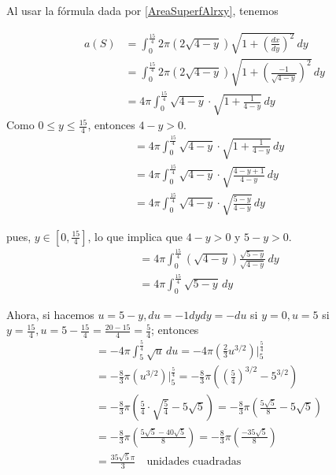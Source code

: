 
Al usar la fórmula dada por \eqref{AreaSuperfAlrxy}, tenemos

{\small
\begin{align*}
a(S) &= \int_{0}^{\frac{15}{4}} 2\pi \left( 2\sqrt{4 - y} \right) 
\sqrt{1 + \left( \frac{dx}{dy} \right)^2} \, dy \\
&= \int_{0}^{\frac{15}{4}} 2\pi \left( 2\sqrt{4 - y} \right) 
\sqrt{1 + \left( \frac{-1}{\sqrt{4 - y}} \right)^2} \, dy \\
&= 4\pi \int_{0}^{\frac{15}{4}} \sqrt{4 - y} \cdot 
\sqrt{1 + \frac{1}{4 - y}} \, dy
\end{align*}
}
Como $0\leq y\leq \frac{15}{4}$, entonces $4-y>0$.
{\small
\[
\begin{aligned}
&= 4\pi \int_{0}^{\frac{15}{4}} \sqrt{4 - y} \cdot \sqrt{1 + \frac{1}{4 - y}} \, dy \\
&= 4\pi \int_{0}^{\frac{15}{4}} \sqrt{4 - y} \cdot \sqrt{\frac{4 - y + 1}{4 - y}} \, dy \\
&= 4\pi \int_{0}^{\frac{15}{4}} \sqrt{4 - y} \cdot \sqrt{\frac{5 - y}{4 - y}} \, dy
\end{aligned}
\]
}

pues, $y\in \left[ 0,\frac{15}{4}\right] $, lo que implica que $4-y>0$ y $5-y>0$.
{\small
\begin{align*}
  &= 4\pi \int_{0}^{\frac{15}{4}} \left( \sqrt{4 - y} \right) \frac{\sqrt{5 - y}}{\sqrt{4 - y}} \, dy \\
  &= 4\pi \int_{0}^{\frac{15}{4}} \sqrt{5 - y} \, dy
\end{align*}
}

Ahora, si hacemos $u=5-y,  du=-1dy  dy=-du$ si $y=0,  u=5$  si $y=\frac{15}{4}, u=5-\frac{15}{4}=\frac{20-15} {4}=\frac{5}{4}$;  entonces
{\small
\begin{align*}
&= -4\pi \int_{5}^{\frac{5}{4}} \sqrt{u} \, du = -4\pi \left( \frac{2}{3} u^{3/2} \right) \Bigg|_{5}^{\frac{5}{4}} \\
&= -\frac{8}{3} \pi \left( u^{3/2} \right) \Bigg|_{5}^{\frac{5}{4}} = -\frac{8}{3} \pi \left( \left( \frac{5}{4} \right)^{3/2} - 5^{3/2} \right) \\
&= -\frac{8}{3} \pi \left( \frac{5}{4} \cdot \sqrt{ \frac{5}{4} } - 5 \sqrt{5} \right) = -\frac{8}{3} \pi \left( \frac{5 \sqrt{5}}{8} - 5 \sqrt{5} \right) \\
&= -\frac{8}{3} \pi \left( \frac{5\sqrt{5} - 40\sqrt{5}}{8} \right) = -\frac{8}{3} \pi \left( \frac{-35\sqrt{5}}{8} \right) \\
&= \frac{35\sqrt{5} \pi}{3} \quad \text{unidades cuadradas}
\end{align*}
}

